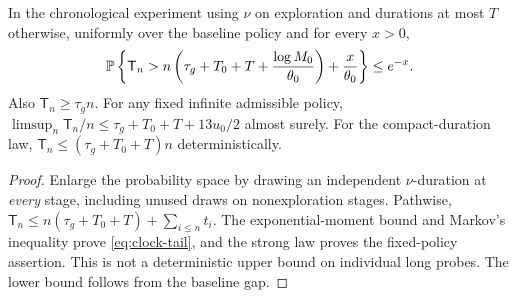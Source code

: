 \begin{proposition}
\label{prop:clock}
In the chronological experiment using $\nu$ on exploration and durations at
most $T$ otherwise, uniformly over the baseline policy and for every $x>0$,
\begin{equation}
 \mathbb P\left\{\mathsf T_n>
 n\left(\tau_g+T_0+T+\frac{\log M_0}{\theta_0}\right)
       +\frac{x}{\theta_0}\right\}\le e^{-x}.
 \label{eq:clock-tail}
\end{equation}
Also $\mathsf T_n\ge\tau_g n$. For any fixed infinite admissible policy,
$\limsup_n\mathsf T_n/n\le\tau_g+T_0+T+13u_0/2$ almost surely.
For the compact-duration law, $\mathsf T_n\le(\tau_g+T_0+T)n$ deterministically.
\end{proposition}
\begin{proof}
Enlarge the probability space by drawing an independent $\nu$-duration at
\emph{every} stage, including unused draws on nonexploration stages. Pathwise,
$\mathsf T_n\le n(\tau_g+T_0+T)+\sum_{i\le n}t_i$. The exponential-moment
bound and Markov's inequality prove \eqref{eq:clock-tail}, and the strong law
proves the fixed-policy assertion. This is not a deterministic upper bound on
individual long probes. The lower bound follows from the baseline gap.
\end{proof}

